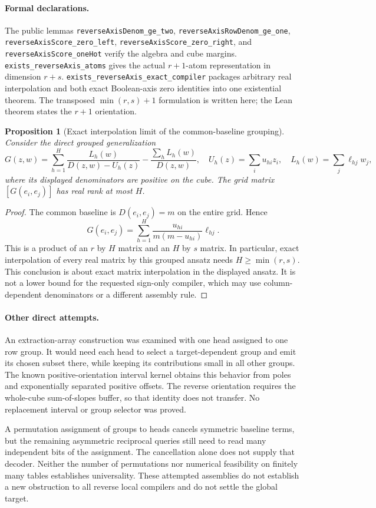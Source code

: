 \documentclass[11pt]{article}
\newtheorem{proposition}{Proposition}
\begin{document}
\paragraph{Formal declarations.}
The public lemmas
\texttt{reverseAxisDenom\_ge\_two},
\texttt{reverseAxisRowDenom\_ge\_one},
\texttt{reverseAxisScore\_zero\_left},
\texttt{reverseAxisScore\_zero\_right}, and
\texttt{reverseAxisScore\_oneHot}
verify the algebra and cube margins.
\texttt{exists\_reverseAxis\_atoms} gives the actual $r+1$-atom
representation in dimension $r+s$.
\texttt{exists\_reverseAxis\_exact\_compiler} packages arbitrary real
interpolation and both exact Boolean-axis zero identities into one
existential theorem. The transposed $\min(r,s)+1$ formulation is written
here; the Lean theorem states the $r+1$ orientation.

\begin{proposition}[Exact interpolation limit of the common-baseline grouping]
Consider the direct grouped generalization
\[
 G(z,w)=\sum_{h=1}^H\frac{L_h(w)}{D(z,w)-U_h(z)}
       -\frac{\sum_h L_h(w)}{D(z,w)},
 \quad U_h(z)=\sum_i u_{hi}z_i,
 \quad L_h(w)=\sum_j\ell_{hj}w_j,
\]
where its displayed denominators are positive on the cube.
The grid matrix $[G(e_i,e_j)]$ has real rank at most $H$.
\end{proposition}
\begin{proof}
The common baseline is $D(e_i,e_j)=m$ on the entire grid. Hence
\[
 G(e_i,e_j)=\sum_{h=1}^H
       \frac{u_{hi}}{m(m-u_{hi})}\ell_{hj}.
\]
This is a product of an $r$ by $H$ matrix and an $H$ by $s$ matrix.
In particular, exact interpolation of every real matrix by this grouped
ansatz needs $H\geq\min(r,s)$. This conclusion is about exact matrix
interpolation in the displayed ansatz. It is not a lower bound for the
requested sign-only compiler, which may use column-dependent denominators
or a different assembly rule.
\end{proof}

\paragraph{Other direct attempts.}
An extraction-array construction was examined with one head assigned to
one row group. It would need each head to select a target-dependent group
and emit its chosen subset there, while keeping its contributions small in
all other groups. The known positive-orientation interval kernel obtains
this behavior from poles and exponentially separated positive offsets.
The reverse orientation requires the whole-cube sum-of-slopes buffer,
so that identity does not transfer. No replacement interval or group
selector was proved.

A permutation assignment of groups to heads cancels symmetric baseline
terms, but the remaining asymmetric reciprocal queries still need to read
many independent bits of the assignment. The cancellation alone does not
supply that decoder. Neither the number of permutations nor numerical
feasibility on finitely many tables establishes universality.
These attempted assemblies do not establish a new obstruction to all
reverse local compilers and do not settle the global target.
\end{document}
